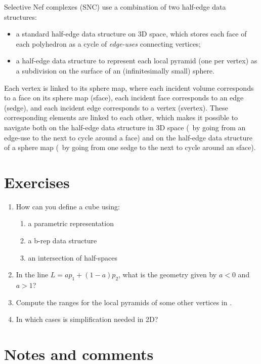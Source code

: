 Selective Nef complexes (SNC) use a combination of two half-edge data structures:

\begin{itemize}
\item a standard half-edge data structure on 3D space, which stores each face of each polyhedron as a cycle of \emph{edge-uses} connecting vertices;
\item a half-edge data structure to represent each local pyramid (one per vertex) as a subdivision on the surface of an (infinitesimally small) sphere.
\end{itemize}

Each vertex is linked to its sphere map, where each incident volume corresponds to a face on its sphere map (sface), each incident face corresponds to an edge (sedge), and each incident edge corresponds to a vertex (svertex).
These corresponding elements are linked to each other, which makes it possible to navigate both on the half-edge data structure in 3D space (\eg\ by going from an edge-use to the next to cycle around a face) and on the half-edge data structure of a sphere map (\eg\ by going from one sedge to the next to cycle around an sface).

%
\section{Exercises}

\begin{enumerate}
	\item How can you define a cube using:
	\begin{enumerate}
		\item a parametric representation
		\item a b-rep data structure
		\item an intersection of half-spaces
	\end{enumerate}
	\item In the line \(L = a p_1 + (1-a) p_2 \), what is the geometry given by \(a < 0\) and \(a > 1\)?
	\item Compute the ranges for the local pyramids of some other vertices in 
	.
	\item In which cases is simplification needed in 2D\@?
\end{enumerate}



%
\section{Notes and comments}

